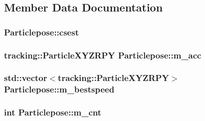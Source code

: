 \subsection{\-Member \-Data \-Documentation}
\hypertarget{class_particlepose_af41bfccd67a035c391b1e4655d66f631}{
\subsubsection[{csest}]{ {\bf \-Particlepose\-::csest}}}\label{class_particlepose_af41bfccd67a035c391b1e4655d66f631}
\hypertarget{class_particlepose_af03fc2a655e8d55116285f7c6b84b008}{
\subsubsection[{m\-\_\-acc}]{\setlength{\rightskip}{0pt plus 5cm}tracking\-::\-Particle\-X\-Y\-Z\-R\-P\-Y {\bf \-Particlepose\-::m\-\_\-acc}}}\label{class_particlepose_af03fc2a655e8d55116285f7c6b84b008}
\hypertarget{class_particlepose_a555761b64f69c60d7633a30013e0e422}{
\subsubsection[{m\-\_\-bestspeed}]{\setlength{\rightskip}{0pt plus 5cm}std\-::vector$<$tracking\-::\-Particle\-X\-Y\-Z\-R\-P\-Y$>$ {\bf \-Particlepose\-::m\-\_\-bestspeed}}}\label{class_particlepose_a555761b64f69c60d7633a30013e0e422}
\hypertarget{class_particlepose_aab1bfddc21050cc4e1ffedd146b4bbaa}{
\subsubsection[{m\-\_\-cnt}]{\setlength{\rightskip}{0pt plus 5cm}int {\bf \-Particlepose\-::m\-\_\-cnt}}}\label{class_particlepose_aab1bfddc21050cc4e1ffedd146b4bbaa}
